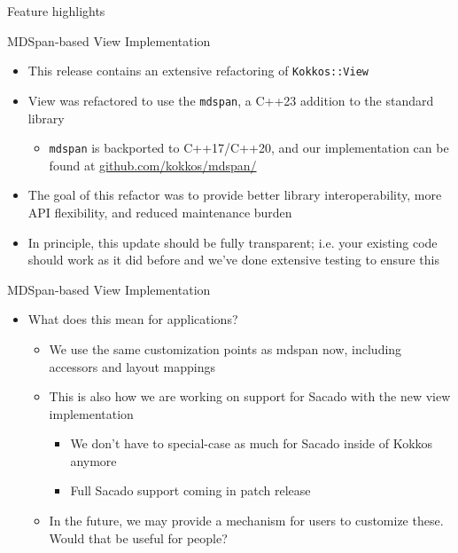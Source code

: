 
\begin{frame}[fragile]

  {\Huge Feature highlights}

  \vspace{10pt}

\end{frame}

\begin{frame}[fragile]{MDSpan-based View Implementation}
  \begin{itemize}
    \item This release contains an extensive refactoring of \texttt{Kokkos::View}
    \item View was refactored to use the \texttt{mdspan}, a C++23 addition to the standard library
    \begin{itemize}
      \item \texttt{mdspan} is backported to C++17/C++20, and our implementation can be found at \url{github.com/kokkos/mdspan/}
    \end{itemize}
    \item The goal of this refactor was to provide better library interoperability, more API flexibility, and reduced maintenance burden
    \item In principle, this update should be fully transparent; i.e. your existing code should work as it did before and we've done extensive testing to ensure this
    \end{itemize}
\end{frame}


\begin{frame}[fragile]{MDSpan-based View Implementation}
  \begin{itemize}
  \item What does this mean for applications?
  \begin{itemize}
    \item We use the same customization points as mdspan now, including accessors and layout mappings
    \item This is also how we are working on support for Sacado with the new view implementation
    \begin{itemize}
      \item We don't have to special-case as much for Sacado inside of Kokkos anymore
      \item Full Sacado support coming in patch release
    \end{itemize}
    \item In the future, we may provide a mechanism for users to customize these. Would that be useful for people?
  \end{itemize}
  \end{itemize}
\end{frame}

